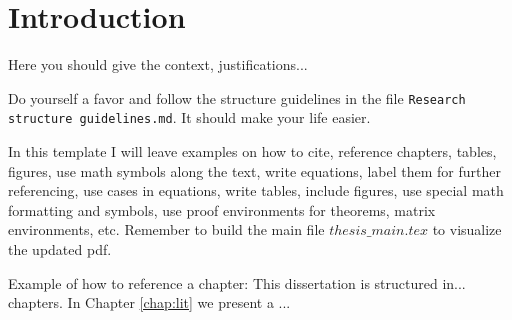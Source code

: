 \chapter{Introduction} \label{chap:intro}

Here you should give the context, justifications...

Do yourself a favor and follow the structure guidelines in the file \texttt{Research struc\-ture guidelines.md}. It should make your life easier.

In this template I will leave examples on how to cite, reference chapters, tables, figures, use math symbols along the text, write equations, label them for further referencing, use cases in equations, write tables, include figures, use special math formatting and symbols, use proof environments for theorems, matrix environments, etc. Remember to build the main file $thesis\_main.tex$ to visualize the updated pdf.

Example of how to reference a chapter: This dissertation is structured in... chapters. In Chapter \ref{chap:lit} we present a ...

\cite{ait2001a}
